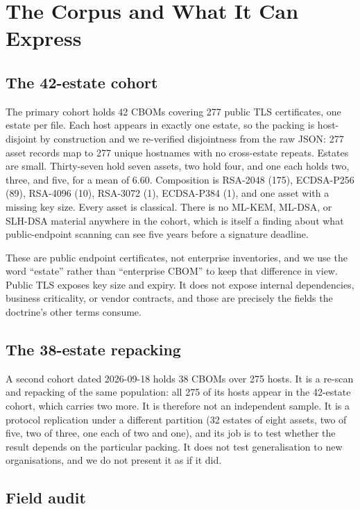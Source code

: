 \documentclass[journal,10pt]{IEEEtran}
\begin{document}
\section{The Corpus and What It Can Express}
\label{sec:corpus}

\subsection{The 42-estate cohort}

The primary cohort holds 42 CBOMs covering 277 public TLS certificates, one estate per file. Each
host appears in exactly one estate, so the packing is host-disjoint by construction and we
re-verified disjointness from the raw JSON: 277 asset records map to 277 unique hostnames with no
cross-estate repeats. Estates are small. Thirty-seven hold seven assets, two hold four, and one
each holds two, three, and five, for a mean of 6.60. Composition is RSA-2048 (175), ECDSA-P256
(89), RSA-4096 (10), RSA-3072 (1), ECDSA-P384 (1), and one asset with a missing key size. Every
asset is classical. There is no ML-KEM, ML-DSA, or SLH-DSA material anywhere in the cohort, which
is itself a finding about what public-endpoint scanning can see five years before a signature
deadline.

These are public endpoint certificates, not enterprise inventories, and we use the word ``estate''
rather than ``enterprise CBOM'' to keep that difference in view. Public TLS exposes key size and
expiry. It does not expose internal dependencies, business criticality, or vendor contracts, and
those are precisely the fields the doctrine's other terms consume.

\subsection{The 38-estate repacking}

A second cohort dated 2026-09-18 holds 38 CBOMs over 275 hosts. It is a re-scan and repacking of
the same population: all 275 of its hosts appear in the 42-estate cohort, which carries two more.
It is therefore not an independent sample. It is a protocol replication under a different partition
(32 estates of eight assets, two of five, two of three, one each of two and one), and its job is to
test whether the result depends on the particular packing. It does not test generalisation to new
organisations, and we do not present it as if it did.

\subsection{Field audit}
\end{document}
